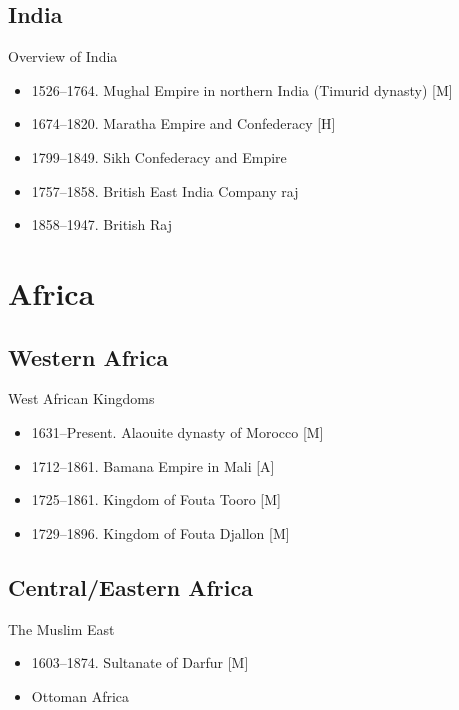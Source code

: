 \subsection{India}
\begin{frame}{Overview of India}
	\begin{itemize}
		\item<5,7-10,12->1526--1764. Mughal Empire in northern India (Timurid dynasty) [M]
		\item<7-10,12->1674--1820. Maratha Empire and Confederacy [H]
		\item<8-10,12->1799--1849. Sikh Confederacy and Empire
		\item<9-10,12->1757--1858. British East India Company raj
		\item<12->1858--1947. British Raj
	\end{itemize}
\end{frame}

\section{Africa}
\subsection{Western Africa}
\begin{frame}{West African Kingdoms}
	\begin{itemize}
		\item<9->1631--Present. Alaouite dynasty of Morocco [M]
		\item<10->1712--1861. Bamana Empire in Mali [A]
		\item<11->1725--1861. Kingdom of Fouta Tooro [M]
		\item<12->1729--1896. Kingdom of Fouta Djallon [M]
	\end{itemize}
\end{frame}

\subsection{Central/Eastern Africa}
\begin{frame}{The Muslim East}
	\begin{itemize}
		\item<4,6>1603--1874. Sultanate of Darfur [M]
		\item<6>Ottoman Africa
	\end{itemize}
\end{frame}
